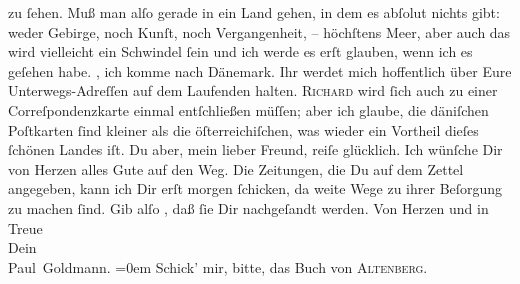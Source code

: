 \begin{ledgroupsized}[t]{13cm}
               zu ſehen. Muß man alſo gerade in ein Land gehen, in dem es  abſolut nichts gibt: weder Gebirge, noch Kunſt, noch Vergangenheit, –
               höchſtens Meer, aber auch das wird vielleicht ein Schwindel ſein und ich werde es
               erſt glauben, wenn ich es geſehen habe.\pend
           \pstart
           \label{K_L02779-2v}\label{K_L02779-2h}, ich komme
               nach Dänemark. Ihr werdet mich hoffentlich über Eure
               Unterwegs-Adreſſen auf dem Laufenden halten. \textsc{Richard} wird ſich auch zu einer Correſpondenzkarte einmal entſchließen {\pb}müſſen; aber ich glaube, die däniſchen Poſtkarten ſind kleiner als die
                  öſterreichiſchen, was
               wieder ein Vortheil dieſes ſchönen Landes iſt.\pend
           \pstart
           Du aber, mein lieber Freund, reiſe glücklich. Ich wünſche Dir von Herzen alles Gute
               auf den Weg.\pend
           \pstart
           Die Zeitungen, die Du auf dem Zettel angegeben, kann ich Dir erſt morgen ſchicken, da weite Wege zu ihrer Beſorgung zu
               machen ſind. Gib alſo \label{K_L02779-3v}\label{K_L02779-3h}, daß ſie
               Dir nachgeſandt werden.\pend
           \pstart
           Von Herzen und in Treue{\\[\baselineskip]}Dein{\\[\baselineskip]}\spacefill\mbox{Paul Goldmann.}\pend
           \leftskip=0em{}\pstart
           \noindent{}Schick’ mir, bitte, das Buch von \textsc{Altenberg}.\pend
           
         
         \endnumbering{}\end{ledgroupsized}  \newcommand{\dateiname}{L02779}\newcommand{\titel}{Paul Goldmann an Arthur Schnitzler, 29. 6. [1896]}\newcommand{\editorInnen}{Martin Anton Müller und Laura Untner}
      
